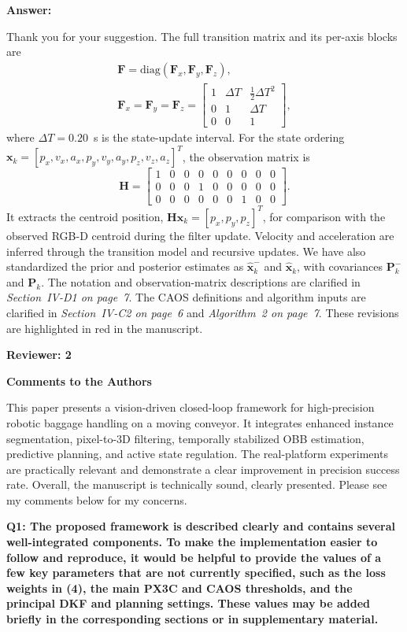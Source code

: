 \documentclass[journal,10pt]{IEEEtran}
\newcommand{\reviewer}[1]{%
  \par\smallskip\noindent
  \textcolor{responseblue}{\textbf{#1\hspace{0.2em}}}\par\nobreak%
}
\newcommand{\question}[2]{%
  \par\smallskip\noindent
  {\color{responseblue}\bfseries\clubpenalty=10000\widowpenalty=10000 Q#1: #2\par}%
  \par\nobreak\noindent
}
\newcommand{\answer}{%
  \par\smallskip\noindent
  \textbf{Answer: }\ignorespaces
}
\newcommand{\reviewercomments}{%
  \par\smallskip\noindent
  {\color{responseblue}\bfseries Comments to the Authors\par\nobreak}%
  \noindent\ignorespaces
}
\begin{document}
\answer
Thank you for your suggestion. The full transition matrix and its per-axis blocks are
\begin{gather*}
\boldsymbol{F}=\mathrm{diag}(\boldsymbol{F}_x,\boldsymbol{F}_y,\boldsymbol{F}_z),\\
\boldsymbol{F}_x=\boldsymbol{F}_y=\boldsymbol{F}_z=
\begin{bmatrix}
1 & \Delta T & \frac{1}{2}\Delta T^2\\
0 & 1 & \Delta T\\
0 & 0 & 1
\end{bmatrix},
\end{gather*}
where $\Delta T=0.20$~s is the state-update interval. For the state ordering $\boldsymbol{x}_k=[p_x,v_x,a_x,p_y,v_y,a_y,p_z,v_z,a_z]^T$, the observation matrix is
\[
\boldsymbol{H}=\begin{bmatrix}
1&0&0&0&0&0&0&0&0\\
0&0&0&1&0&0&0&0&0\\
0&0&0&0&0&0&1&0&0
\end{bmatrix}.
\]
It extracts the centroid position, $\boldsymbol{H}\boldsymbol{x}_k=[p_x,p_y,p_z]^T$, for comparison with the observed RGB-D centroid during the filter update. Velocity and acceleration are inferred through the transition model and recursive updates. We have also standardized the prior and posterior estimates as $\hat{\boldsymbol{x}}_k^{-}$ and $\hat{\boldsymbol{x}}_k$, with covariances $\boldsymbol{P}_k^{-}$ and $\boldsymbol{P}_k$. The notation and observation-matrix descriptions are clarified in \textit{Section~IV-D1 on page~7}. The CAOS definitions and algorithm inputs are clarified in \textit{Section~IV-C2 on page~6} and \textit{Algorithm~2 on page~7}. These revisions are highlighted in red in the manuscript.

\reviewer{Reviewer: 2}

\reviewercomments
This paper presents a vision-driven closed-loop framework for high-precision robotic baggage handling on a moving conveyor. It integrates enhanced instance segmentation, pixel-to-3D filtering, temporally stabilized OBB estimation, predictive planning, and active state regulation. The real-platform experiments are practically relevant and demonstrate a clear improvement in precision success rate. Overall, the manuscript is technically sound, clearly presented. Please see my comments below for my concerns.

\question{1}{The proposed framework is described clearly and contains several well-integrated components. To make the implementation easier to follow and reproduce, it would be helpful to provide the values of a few key parameters that are not currently specified, such as the loss weights in (4), the main PX3C and CAOS thresholds, and the principal DKF and planning settings. These values may be added briefly in the corresponding sections or in supplementary material.}
\end{document}
